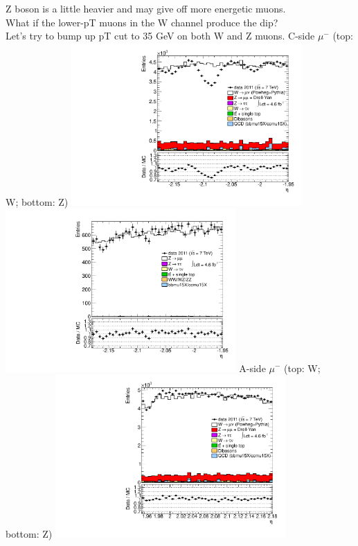  {
Z boson is a little heavier and may give off more energetic muons. \\
What if the lower-pT muons in the W channel produce the dip? \\
Let's try to bump up pT cut to 35 GeV on both W and Z muons.
}
 {
\colb[T]
C-side $\mu^{-}$ (top: W; bottom: Z)
\centering
\includegraphics[width=0.66\textwidth]{dates/20130306/figures/both/Wpt35_10_C_stack_l_eta_NEG} \\
\includegraphics[width=0.66\textwidth]{dates/20130306/figures/both/Zpt35_10_C_stack_lN_eta_ALL.pdf}
A-side $\mu^{-}$ (top: W; bottom: Z)
\centering
\includegraphics[width=0.66\textwidth]{dates/20130306/figures/both/Wpt35_10_A_stack_l_eta_NEG} \\
}
